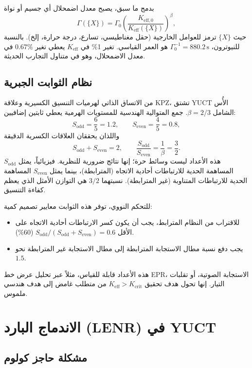 \documentclass[11pt,a4paper]{article}
\newcommand{\Keff}{K_{\mathrm{eff}}}
\newcommand{\Keffzero}{K_{\mathrm{eff},0}}
\newcommand{\Kcrit}{K_{\mathrm{crit}}}
\newcommand{\Sodd}{S_{\mathrm{odd}}}
\newcommand{\Seven}{S_{\mathrm{even}}}
\theoremstyle{remark}
\begin{document}
	بدمج ما سبق، يصبح معدل اضمحلال أي جسيم أو نواة
	\begin{equation}
		\Gamma(\{X\}) = \Gamma_0 \left( \frac{\Keffzero}{\Keff(\{X\})} \right)^{\beta},
		\label{eq:general-rate}
	\end{equation}
	حيث \(\{X\}\) ترمز للعوامل الخارجية (حقل مغناطيسي، تسارع، درجة حرارة، إلخ). بالنسبة للنيوترون، \(\Gamma_0^{-1} = 880.2\,\text{s}\) هو العمر القياسي. تغير 1\% في \(\Keff\) يعطي تغير \(0.67\%\) في معدل الاضمحلال، وهو في متناول التجارب الحديثة.
	
	\subsection{نظام الثوابت الجبرية}
	\label{sec:algebraic}
	
	من الاتساق الذاتي لهرميات التنسيق الكسيرية وعلاقة KPZ، تشتق YUCT الأُس الشامل \(\beta = 2/3\). جمع المتوالية الهندسية للمستويات الهرمية يعطي ثابتين إضافيين:
	\[
	\Sodd = \frac{6}{5}=1.2,\qquad \Seven = \frac{4}{5}=0.8,
	\]
	واللذان يحققان العلاقات الكسرية الدقيقة
	\[
	\Sodd + \Seven = 2,\qquad \frac{\Sodd}{\Seven} = \frac{1}{\beta} = \frac{3}{2}.
	\]
	هذه الأعداد ليست وسائط حرة؛ إنها نتائج ضرورية للنظرية. فيزيائياً، يمثل \(\Sodd\) المساهمة الحدية للارتباطات أحادية الاتجاه (المترابطة)، بينما يمثل \(\Seven\) المساهمة الحدية للارتباطات المتناوبة (غير المترابطة). نسبتهما \(3/2\) هي التوازن الأمثل الذي يعظم كفاءة التنسيق.
	
	للتحكم النووي، توفر هذه الثوابت معايير تصميم كمية:
	\begin{itemize}
		\item للاقتراب من النظام المترابط، يجب أن يكون كسر الارتباطات أحادية الاتجاه على الأقل \(\Sodd/(\Sodd+\Seven)=0.6\) (60\%).
		\item يجب دفع نسبة مطال الاستجابة المترابطة إلى مطال الاستجابة غير المترابطة نحو \(1.5\).
	\end{itemize}
	هذه الأعداد قابلة للقياس، مثلاً عبر تحليل عرض خط EPR، الاستجابة الصوتية، أو تقلبات التيار. إنها تحول هدف تحقيق \(\Keff > \Kcrit\) من متطلب غامض إلى هدف هندسي ملموس.
	
	\section{الاندماج البارد (LENR) في YUCT}
	\label{sec:fusion}
	
	\subsection{مشكلة حاجز كولوم}
	
\end{document}

